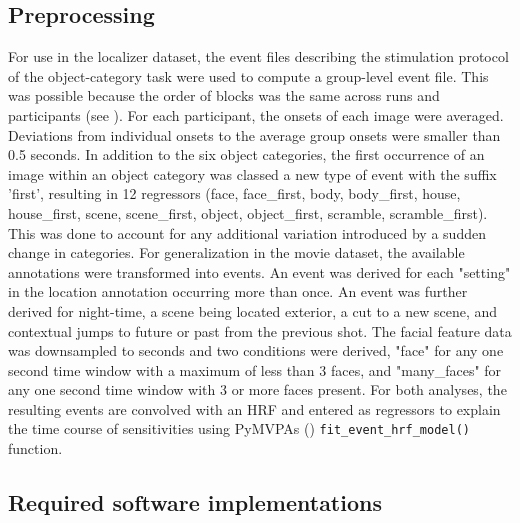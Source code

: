 \documentclass[a4paper, 12pt]{scrreprt}
\begin{document}
\subsection{Preprocessing}

For use in the localizer dataset, the event files describing the stimulation protocol of the object-category task were used to compute a group-level event file. This was possible because the order of blocks was the same across runs and participants (see \cite{sengupta2016studyforrest}). For each participant, the onsets of each image were averaged. Deviations from individual onsets to the average group onsets were smaller than 0.5 seconds. In addition to the six object categories, the first occurrence of an image within an object category was classed a new type of event with the suffix 'first', resulting in 12 regressors (face, face\_first, body, body\_first, house, house\_first, scene, scene\_first, object, object\_first, scramble, scramble\_first). This was done to account for any additional variation introduced by a sudden change in categories. 
For generalization in the movie dataset, the available annotations were transformed into events. An event was derived for each "setting" in the location annotation occurring more than once. An event was further derived for night-time, a scene being located exterior, a cut to a new scene, and contextual jumps to future or past from the previous shot. The facial feature data was downsampled to seconds and two conditions were derived, "face" for any one second time window with a maximum of less than 3 faces, and "many\_faces" for any one second time window with 3 or more faces present.
For both analyses, the resulting events are convolved with an HRF and entered as regressors to explain the time course of sensitivities using PyMVPAs (\cite{hanke2009pymvpa})  \texttt{fit\_event\_hrf\_model() }function. \newline

\subsection{Required software implementations}
\end{document}
